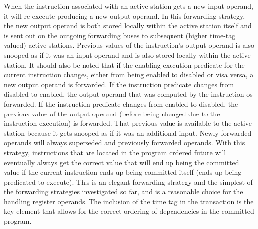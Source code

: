 \documentclass[10pt,dvips]{article}
\begin{document}
When the instruction associated with an active station gets
a new input operand, it will re-execute producing a new
output operand.  In this forwarding strategy, the new output
operand is both stored locally within the active station itself
and is sent out on the outgoing forwarding buses
to subsequent (higher time-tag valued) active stations.
Previous values of the instruction's output operand is also
snooped as if it was an input operand and is also stored locally
within the active station.
It should also be noted that if the enabling execution predicate
for the current instruction changes, either from being enabled
to disabled or visa versa, a new output operand is forwarded.
If the instruction predicate changes from disabled to enabled,
the output operand that was computed by the instruction os
forwarded.  If the instruction predicate changes from enabled
to disabled, the previous value of the output operand (before being
changed due to the instruction execution) is forwarded.
That previous value is available to the active station because
it gets snooped as if it was an additional input.
Newly forwarded operands will always superseded and previously
forwarded operands.
With this strategy, instructions that are located in the program
ordered future will eventually always get the correct
value that will end up being the committed value if the
current instruction ends up being committed itself (ends
up being predicated to execute).
This is an elegant forwarding strategy and
the simplest of the forwarding strategies investigated so far, and
is a reasonable choice for the handling register operands.
The inclusion of the time tag in the transaction is the
key element that allows for the correct ordering of
dependencies in the committed program.
%
\end{document}

